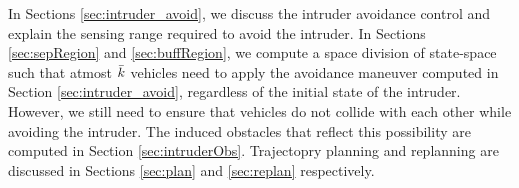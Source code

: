 In Sections \ref{sec:intruder_avoid}, we discuss the intruder avoidance control and explain the sensing range required to avoid the intruder. In Sections \ref{sec:sepRegion} and \ref{sec:buffRegion}, we compute a space division of state-space such that atmost $\bar{k}$ vehicles need to apply the avoidance maneuver computed in Section \ref{sec:intruder_avoid}, regardless of the initial state of the intruder. However, we still need to ensure that vehicles do not collide with each other while avoiding the intruder. The induced obstacles that reflect this possibility are computed in Section \ref{sec:intruderObs}. Trajectopry planning and replanning are discussed in Sections \ref{sec:plan} and \ref{sec:replan} respectively.
